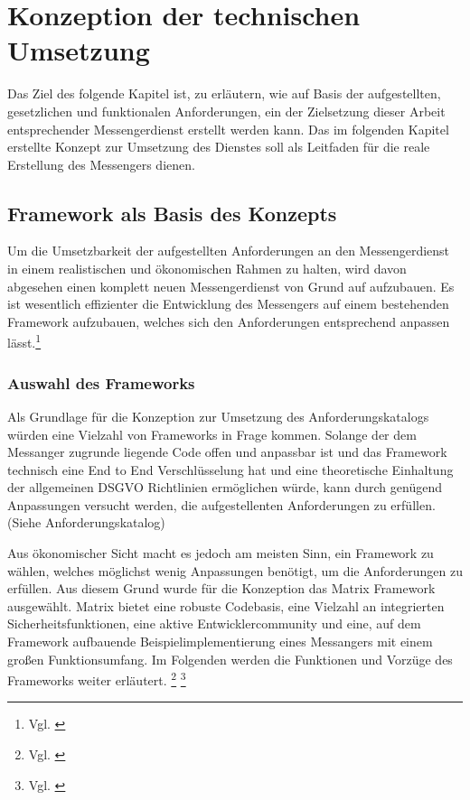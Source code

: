 \chapter{Konzeption der technischen Umsetzung}\label{chapter:tanforderungen}
Das Ziel des folgende Kapitel ist, zu erläutern, wie auf Basis der aufgestellten, gesetzlichen und funktionalen Anforderungen, ein der Zielsetzung dieser Arbeit entsprechender Messengerdienst erstellt werden kann. Das im folgenden Kapitel erstellte Konzept zur Umsetzung des Dienstes soll als Leitfaden für die reale Erstellung des Messengers dienen. 

\section{Framework als Basis des Konzepts}\label{chapter:kr}
Um die Umsetzbarkeit der aufgestellten Anforderungen an den Messengerdienst in einem realistischen und ökonomischen Rahmen zu halten, wird davon abgesehen einen komplett neuen Messengerdienst von Grund auf aufzubauen. Es ist wesentlich effizienter die Entwicklung des Messengers auf einem bestehenden Framework aufzubauen, welches sich den Anforderungen entsprechend anpassen lässt.\footnote{Vgl. \cite[S. 107 ff.]{Johnson2005}}

\subsection{Auswahl des Frameworks}\label{chapter:am}
Als Grundlage für die Konzeption zur Umsetzung des Anforderungskatalogs würden eine Vielzahl von Frameworks in Frage kommen. Solange der dem Messanger zugrunde liegende Code offen und anpassbar ist und das Framework technisch eine End to End Verschlüsselung hat und eine theoretische Einhaltung der allgemeinen DSGVO Richtlinien ermöglichen würde, kann durch genügend Anpassungen versucht werden, die aufgestellenten Anforderungen zu erfüllen. (Siehe Anforderungskatalog)

Aus ökonomischer Sicht macht es jedoch am meisten Sinn, ein Framework zu wählen, welches möglichst wenig Anpassungen benötigt, um die Anforderungen zu erfüllen. Aus diesem Grund wurde für die Konzeption das Matrix Framework ausgewählt.
Matrix bietet eine robuste Codebasis, eine Vielzahl an integrierten Sicherheitsfunktionen, eine aktive Entwicklercommunity und eine, auf dem Framework aufbauende Beispielimplementierung eines Messangers mit einem großen Funktionsumfang. Im Folgenden werden die Funktionen und Vorzüge des Frameworks weiter erläutert. \footnote{Vgl. \cite{Matrix.org2020}} \footnote{Vgl. \cite{Github2020}} 

